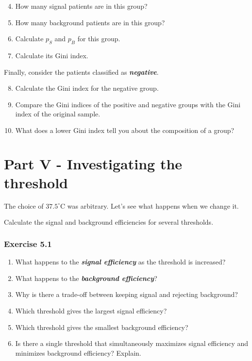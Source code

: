 \documentclass{course_sheet}
\begin{document}
\begin{enumerate}
\setcounter{enumi}{3}
\item
How many signal patients are in this group?

\item
How many background patients are in this group?

\item
Calculate $p_S$ and $p_B$ for this group.

\item
Calculate its Gini index.

\end{enumerate}
Finally, consider the patients classified as \textbf{\textit{negative}}.

\begin{enumerate}
\setcounter{enumi}{7}
\item
Calculate the Gini index for the negative group.

\item
Compare the Gini indices of the positive and negative groups with the Gini index of the original sample.

\item
What does a lower Gini index tell you about the composition of a group?

\end{enumerate}
\clearpage
\section*{Part V - Investigating the threshold}
The choice of $37.5^\circ\mathrm{C}$ was arbitrary. Let's see what happens when we change it.

Calculate the signal and background efficiencies for several thresholds.

\subsubsection*{Exercise 5.1}
\begin{enumerate}
\item
What happens to the \textbf{\textit{signal efficiency}} as the threshold is increased?

\item
What happens to the \textbf{\textit{background efficiency}}?

\item
Why is there a trade-off between keeping signal and rejecting background?

\item
Which threshold gives the largest signal efficiency?

\item
Which threshold gives the smallest background efficiency?

\item
Is there a single threshold that simultaneously maximizes signal efficiency and minimizes background efficiency? Explain.

\end{enumerate}
\clearpage
\end{document}
